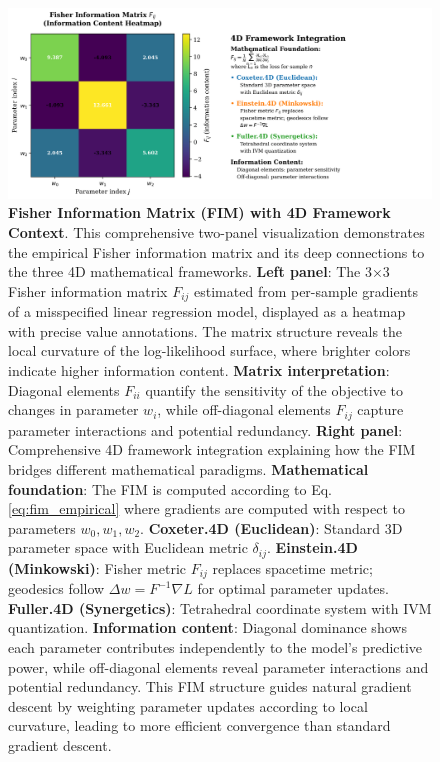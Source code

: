 \documentclass[
  10pt,
]{article}
\begin{document}
\begin{figure}
\centering
\includegraphics{../output/figures/fisher_information_matrix.png}
\caption{\textbf{Fisher Information Matrix (FIM) with 4D Framework
Context}. This comprehensive two-panel visualization demonstrates the
empirical Fisher information matrix and its deep connections to the
three 4D mathematical frameworks. \textbf{Left panel}: The 3×3 Fisher
information matrix \(F_{ij}\) estimated from per-sample gradients of a
misspecified linear regression model, displayed as a heatmap with
precise value annotations. The matrix structure reveals the local
curvature of the log-likelihood surface, where brighter colors indicate
higher information content. \textbf{Matrix interpretation}: Diagonal
elements \(F_{ii}\) quantify the sensitivity of the objective to changes
in parameter \(w_i\), while off-diagonal elements \(F_{ij}\) capture
parameter interactions and potential redundancy. \textbf{Right panel}:
Comprehensive 4D framework integration explaining how the FIM bridges
different mathematical paradigms. \textbf{Mathematical foundation}: The
FIM is computed according to Eq. \eqref{eq:fim_empirical} where
gradients are computed with respect to parameters \(w_0, w_1, w_2\).
\textbf{Coxeter.4D (Euclidean)}: Standard 3D parameter space with
Euclidean metric \(\delta_{ij}\). \textbf{Einstein.4D (Minkowski)}:
Fisher metric \(F_{ij}\) replaces spacetime metric; geodesics follow
\(\Delta w = F^{-1}\nabla L\) for optimal parameter updates.
\textbf{Fuller.4D (Synergetics)}: Tetrahedral coordinate system with IVM
quantization. \textbf{Information content}: Diagonal dominance shows
each parameter contributes independently to the model's predictive
power, while off-diagonal elements reveal parameter interactions and
potential redundancy. This FIM structure guides natural gradient descent
by weighting parameter updates according to local curvature, leading to
more efficient convergence than standard gradient descent.}
\end{figure}
\end{document}
